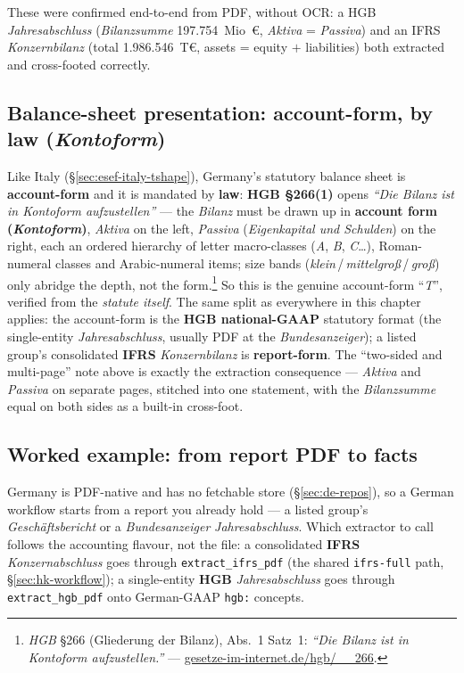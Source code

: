 \documentclass[11pt,a4paper]{report}
\begin{document}
\noindent These were confirmed end-to-end from PDF, without OCR: a HGB \emph{Jahresabschluss}
(\emph{Bilanzsumme} 197.754~Mio~€, \emph{Aktiva} = \emph{Passiva}) and an IFRS \emph{Konzernbilanz}
(total 1.986.546~T€, assets = equity \(+\) liabilities) both extracted and cross-footed correctly.

\subsection{Balance-sheet presentation: account-form, by law (\emph{Kontoform})}
\label{sec:esef-germany-tshape}

Like Italy (\S\ref{sec:esef-italy-tshape}), Germany's statutory balance sheet is \textbf{account-form} and it
is mandated by \textbf{law}: \textbf{HGB §266(1)} opens \emph{``Die Bilanz ist in Kontoform aufzustellen''} ---
the \emph{Bilanz} must be drawn up in \textbf{account form (\emph{Kontoform})}, \emph{Aktiva} on the left,
\emph{Passiva} (\emph{Eigenkapital und Schulden}) on the right, each an ordered hierarchy of letter
macro-classes (\emph{A}, \emph{B}, \emph{C}\ldots), Roman-numeral classes and Arabic-numeral items; size bands
(\emph{klein}\,/\,\emph{mittelgroß}\,/\,\emph{groß}) only abridge the depth, not the form.\footnote{\emph{HGB}
§266 (Gliederung der Bilanz), Abs.~1 Satz~1: \emph{``Die Bilanz ist in Kontoform aufzustellen.''} ---
\href{https://www.gesetze-im-internet.de/hgb/__266.html}{gesetze-im-internet.de/hgb/\_\_266}.} So this is the
genuine account-form ``\emph{T}'', verified from the \emph{statute itself}. The same split as everywhere in
this chapter applies: the account-form is the \textbf{HGB national-GAAP} statutory format (the single-entity
\emph{Jahresabschluss}, usually PDF at the \emph{Bundesanzeiger}); a listed group's consolidated \textbf{IFRS}
\emph{Konzernbilanz} is \textbf{report-form}. The ``two-sided and multi-page'' note above is exactly the
extraction consequence --- \emph{Aktiva} and \emph{Passiva} on separate pages, stitched into one statement,
with the \emph{Bilanzsumme} equal on both sides as a built-in cross-foot.

\subsection{Worked example: from report PDF to facts}\label{sec:de-workflow}

Germany is PDF-native and has no fetchable store (\S\ref{sec:de-repos}), so a German workflow starts from a
report you already hold --- a listed group's \emph{Gesch\"aftsbericht} or a \emph{Bundesanzeiger}
\emph{Jahresabschluss}. Which extractor to call follows the accounting flavour, not the file: a consolidated
\textbf{IFRS} \emph{Konzernabschluss} goes through \texttt{extract\_ifrs\_pdf} (the shared \texttt{ifrs-full}
path, \S\ref{sec:hk-workflow}); a single-entity \textbf{HGB} \emph{Jahresabschluss} goes through
\texttt{extract\_hgb\_pdf} onto German-GAAP \texttt{hgb:} concepts.
\end{document}
